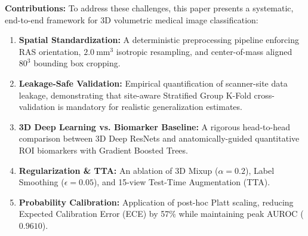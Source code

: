 \textbf{Contributions:} To address these challenges, this paper presents a systematic, end-to-end framework for 3D volumetric medical image classification:
\begin{enumerate}
    \item \textbf{Spatial Standardization:} A deterministic preprocessing pipeline enforcing RAS orientation, $2.0~\text{mm}^3$ isotropic resampling, and center-of-mass aligned $80^3$ bounding box cropping.
    \item \textbf{Leakage-Safe Validation:} Empirical quantification of scanner-site data leakage, demonstrating that site-aware Stratified Group K-Fold cross-validation is mandatory for realistic generalization estimates.
    \item \textbf{3D Deep Learning vs. Biomarker Baseline:} A rigorous head-to-head comparison between 3D Deep ResNets and anatomically-guided quantitative ROI biomarkers with Gradient Boosted Trees.
    \item \textbf{Regularization \& TTA:} An ablation of 3D Mixup ($\alpha=0.2$), Label Smoothing ($\epsilon=0.05$), and 15-view Test-Time Augmentation (TTA).
    \item \textbf{Probability Calibration:} Application of post-hoc Platt scaling, reducing Expected Calibration Error (ECE) by 57\% while maintaining peak AUROC ($0.9610$).
\end{enumerate}